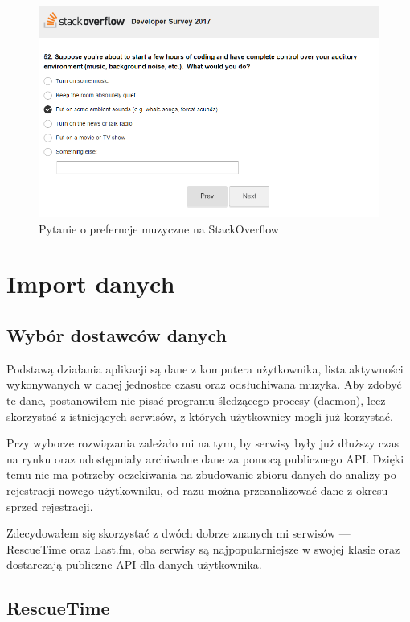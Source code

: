 \documentclass[brudnopis]{xmgr}
\begin{document}
\begin{figure}
  \includegraphics[width=\linewidth]{fig/stack_overflow_music.png}
  \caption{Pytanie o preferncje muzyczne na StackOverflow}
  \label{fig:Pytanie o preferncje muzyczne na StackOverflow}
\end{figure}

\chapter{Import danych}

    \section{Wybór dostawców danych}

    Podstawą działania aplikacji są dane z komputera użytkownika,
    lista aktywności wykonywanych w danej jednostce czasu oraz odsłuchiwana muzyka.
    Aby zdobyć te dane, postanowiłem nie pisać programu śledzącego procesy (daemon),
    lecz skorzystać z istniejących serwisów, z których użytkownicy mogli już korzystać.

    Przy wyborze rozwiązania zależało mi na tym, by serwisy były już dłuższy czas na rynku
    oraz udostępniały archiwalne dane za pomocą publicznego API.
    Dzięki temu nie ma potrzeby oczekiwania na zbudowanie zbioru danych do analizy po rejestracji nowego użytkowniku,
    od razu można przeanalizować dane z okresu sprzed rejestracji.

    Zdecydowałem się skorzystać z dwóch dobrze znanych mi serwisów --- RescueTime oraz Last.fm,
    oba serwisy są najpopularniejsze w swojej klasie oraz dostarczają publiczne API dla danych użytkownika.

        \section*{RescueTime}
\end{document}
